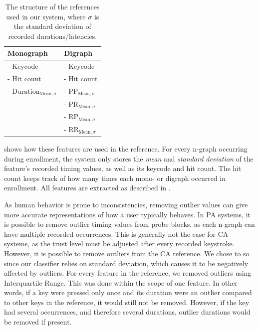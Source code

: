 \begin{table}[h]
\centering
\begin{tabular}{|l|l|}
\hline
Monograph & Digraph\\ \hline
- Keycode & - Keycode\\
- Hit count & - Hit count\\
- $\text{Duration}_{\text{Mean}, \sigma} $& - $\text{PP}_{\text{Mean}, \sigma}$\\
& - $\text{PR}_{\text{Mean}, \sigma}$  \\
& - $\text{RP}_{\text{Mean}, \sigma}$ \\
& - $\text{RR}_{\text{Mean}, \sigma}$
\\ \hline
\end{tabular}

\caption{The structure of the references used in our system, where $\sigma$ is the standard deviation of recorded durations/latencies.}
\label{tab:CA-reference-structure}
\end{table}
 shows how these features are used in the reference.
For every n-graph occurring during enrollment, the system only stores the \textit{mean} and \textit{standard deviation} of the feature's recorded timing values, as well as its keycode and hit count.
The hit count keeps track of how many times each mono- or digraph occurred in enrollment.
All features are extracted as described in .


As human behavior is prone to inconsistencies, removing outlier values can give more accurate representations of how a user typically behaves.
In PA systems, it is possible to remove outlier timing values from probe blocks, as each n-graph can have multiple recorded occurrences.
This is generally not the case for CA systems, as the trust level must be adjusted after every recorded keystroke.
However, it is possible to remove outliers from the CA reference.
We chose to so since our classifier relies on standard deviation, which causes it to be negatively affected by outliers.
For every feature in the reference, we removed outliers using Interquartile Range.
This was done within the scope of one feature. 
In other words, if a key were pressed only once and its duration were an outlier compared to other keys in the reference, it would still not be removed.
However, if the key had several occurrences, and therefore several durations, outlier durations would be removed if present.


